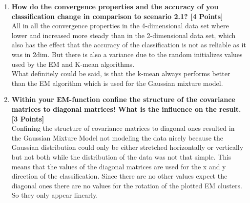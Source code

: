 \documentclass[a4paper]{article}
\begin{document}
\begin{enumerate}
\item \textbf{How do the convergence properties and the accuracy of you classification change in comparison to scenario 2.1? [4 Points]} \\ \newline
All in all the convergence properties in the 4-dimensional data set where lower and increased more steady than in the 2-dimensional data set, which also has the effect that the accuracy of the classification is not as reliable as it was in 2dim. But there is also a variance due to the random initializes values used by the EM and K-mean algorithms. \\ \newline
What definitely could be said, is that the k-mean always performs better than the EM algorithm which is used for the Gaussian mixture model.

\newpage

\item \textbf{Within your EM-function confine the structure of the covariance matrices to diagonal matrices! What is the influence on the result. [3 Points]} \\ \newline
Confining the structure of covariance matrices to diagonal ones resulted in the
Gaussian Mixture Model not modeling the data nicely because the Gaussian distribution could only be either stretched horizontally or vertically but not both while the distribution of the data was not that simple. This means that the values of the diagonal matrices are used for the x and y direction of the classification. Since there are no other values expect the diagonal ones there are no values for the rotation of the plotted EM clusters. So they only appear linearly.


\end{enumerate}
\end{document}
